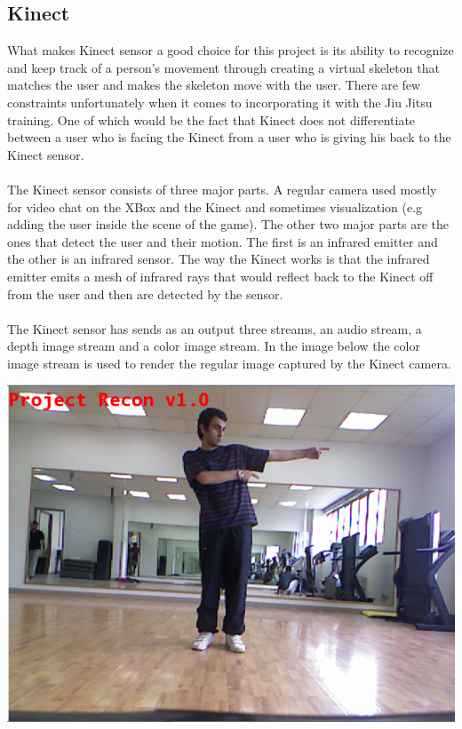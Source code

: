 \subsection{Kinect}
What makes Kinect sensor a good choice for this project is its ability to recognize and keep track of a person's movement through creating a virtual skeleton that matches the user and makes the skeleton move with the user. There are few constraints unfortunately when it comes to incorporating it with the Jiu Jitsu training. One of which would be the fact that Kinect does not differentiate between a user who is facing the Kinect from a user who is giving his back to the Kinect sensor.
\\
\\
The Kinect sensor consists of three major parts. A regular camera used mostly for video chat on the XBox and the Kinect and sometimes visualization (e.g adding the user inside the scene of the game). The other two major parts are the ones that detect the user and their motion. The first is an infrared emitter and the other is an infrared sensor. The way the Kinect works is that the infrared emitter emits a mesh of infrared rays that would reflect back to the Kinect off from the user and then are detected by the sensor.
\\
\\
The Kinect sensor has sends as an output three streams, an audio stream, a depth image stream and a color image stream. In the image below the color image stream is used to render the regular image captured by the Kinect camera.
\\
\centerline{\includegraphics[scale=0.5]{color_data.png}}
